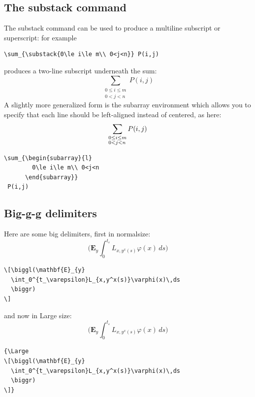 \documentclass{article}
\newcommand{\ntt}{\normalfont\ttfamily}
\newcommand{\cn}[1]{{\protect\ntt\bslash#1}}
\newcommand{\env}[1]{{\protect\ntt#1}}
\theoremstyle{definition}
\theoremstyle{remark}
\begin{document}
\subsection{The \cn{substack} command}

The \cn{substack} command can be used to produce a multiline
subscript or superscript:
for example
\begin{verbatim}
\sum_{\substack{0\le i\le m\\ 0<j<n}} P(i,j)
\end{verbatim}
produces a two-line subscript underneath the sum:
\begin{equation}
\sum_{\substack{0\le i\le m\\ 0<j<n}} P(i,j)
\end{equation}
A slightly more generalized form is the \env{subarray} environment which
allows you to specify that each line should be left-aligned instead of
centered, as here:
\begin{equation}
\sum_{\begin{subarray}{l}
        0\le i\le m\\ 0<j<n
      \end{subarray}}
 P(i,j)
\end{equation}
\begin{verbatim}
\sum_{\begin{subarray}{l}
        0\le i\le m\\ 0<j<n
      \end{subarray}}
 P(i,j)
\end{verbatim}


\subsection{Big-g-g delimiters}
Here are some big delimiters, first in \cn{normalsize}:
\[\biggl(\mathbf{E}_{y}
  \int_0^{t_\varepsilon}L_{x,y^x(s)}\varphi(x)\,ds
  \biggr)
\]
\begin{verbatim}
\[\biggl(\mathbf{E}_{y}
  \int_0^{t_\varepsilon}L_{x,y^x(s)}\varphi(x)\,ds
  \biggr)
\]
\end{verbatim}
and now in \cn{Large} size:
{\Large
\[\biggl(\mathbf{E}_{y}
  \int_0^{t_\varepsilon}L_{x,y^x(s)}\varphi(x)\,ds
  \biggr)
\]}
\begin{verbatim}
{\Large
\[\biggl(\mathbf{E}_{y}
  \int_0^{t_\varepsilon}L_{x,y^x(s)}\varphi(x)\,ds
  \biggr)
\]}
\end{verbatim}
\end{document}
